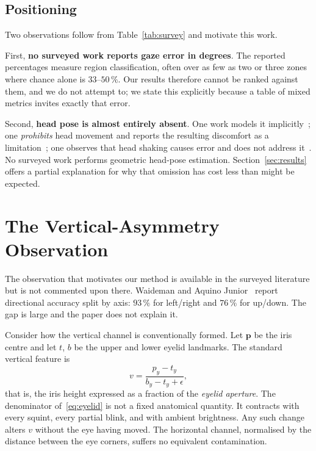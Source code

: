 \documentclass[conference]{IEEEtran}
\begin{document}
\subsection{Positioning}

Two observations follow from Table~\ref{tab:survey} and motivate this work.

First, \textbf{no surveyed work reports gaze error in degrees}. The reported
percentages measure region classification, often over as few as two or three
zones where chance alone is $33$--$50\,\%$. Our results therefore cannot be
ranked against them, and we do not attempt to; we state this explicitly because
a table of mixed metrics invites exactly that error.

Second, \textbf{head pose is almost entirely absent}. One work models it
implicitly~\cite{ref01}; one \emph{prohibits} head movement and reports the
resulting discomfort as a limitation~\cite{ref02}; one observes that head
shaking causes error and does not address it~\cite{ref09b}. No surveyed work
performs geometric head-pose estimation. Section~\ref{sec:results} offers a
partial explanation for why that omission has cost less than might be expected.

\section{The Vertical-Asymmetry Observation}

The observation that motivates our method is available in the surveyed
literature but is not commented upon there. Waideman and Aquino
Junior~\cite{ref01} report directional accuracy split by axis: $93\,\%$ for
left/right and $76\,\%$ for up/down. The gap is large and the paper does not
explain it.

Consider how the vertical channel is conventionally formed. Let $\mathbf{p}$ be
the iris centre and let $t$, $b$ be the upper and lower eyelid landmarks. The
standard vertical feature is
\begin{equation}
v = \frac{p_y - t_y}{b_y - t_y + \epsilon},
\label{eq:eyelid}
\end{equation}
that is, the iris height expressed as a fraction of the \emph{eyelid aperture}.
The denominator of~\eqref{eq:eyelid} is not a fixed anatomical quantity. It
contracts with every squint, every partial blink, and with ambient brightness.
Any such change alters $v$ without the eye having moved. The horizontal channel,
normalised by the distance between the eye corners, suffers no equivalent
contamination.
\end{document}
